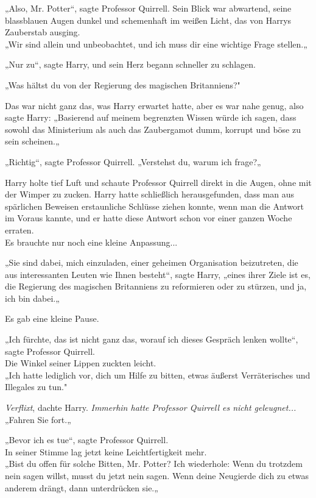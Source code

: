 {„Also, Mr. Potter“, sagte Professor Quirrell. Sein Blick war abwartend, seine blassblauen Augen dunkel und schemenhaft im weißen Licht, das von Harrys Zauberstab ausging.\\ „Wir sind allein und unbeobachtet, und ich muss dir eine wichtige Frage stellen.„

„Nur zu“, sagte Harry, und sein Herz begann schneller zu schlagen.

„Was hältst du von der Regierung des magischen Britanniens?"

Das war nicht ganz das, was Harry erwartet hatte, aber es war nahe genug, also sagte Harry: „Basierend auf meinem begrenzten Wissen würde ich sagen, dass sowohl das Ministerium als auch das Zaubergamot dumm, korrupt und böse zu sein scheinen.„

„Richtig“, sagte Professor Quirrell. „Verstehst du, warum ich frage?„

Harry holte tief Luft und schaute Professor Quirrell direkt in die Augen, ohne mit der Wimper zu zucken. Harry hatte schließlich herausgefunden, dass man aus spärlichen Beweisen erstaunliche Schlüsse ziehen konnte, wenn man die Antwort im Voraus kannte, und er hatte diese Antwort schon vor einer ganzen Woche erraten.\\ Es brauchte nur noch eine kleine Anpassung...

„Sie sind dabei, mich einzuladen, einer geheimen Organisation beizutreten, die aus interessanten Leuten wie Ihnen besteht“, sagte Harry, „eines ihrer Ziele ist es, die Regierung des magischen Britanniens zu reformieren oder zu stürzen, und ja, ich bin dabei.„

Es gab eine kleine Pause.

„Ich fürchte, das ist nicht ganz das, worauf ich dieses Gespräch lenken wollte“, sagte Professor Quirrell.\\ Die Winkel seiner Lippen zuckten leicht.\\ „Ich hatte lediglich vor, dich um Hilfe zu bitten, etwas äußerst Verräterisches und Illegales zu tun."

\emph{Verflixt}, dachte Harry. \emph{Immerhin hatte Professor Quirrell es nicht geleugnet...}\\ „Fahren Sie fort.„

„Bevor ich es tue“, sagte Professor Quirrell.\\ In seiner Stimme lag jetzt keine Leichtfertigkeit mehr.\\ „Bist du offen für solche Bitten, Mr. Potter? Ich wiederhole: Wenn du trotzdem nein sagen willst, musst du jetzt nein sagen. Wenn deine Neugierde dich zu etwas anderem drängt, dann unterdrücken sie.„

}
